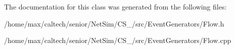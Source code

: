 \-The documentation for this class was generated from the following files\-:\begin{DoxyCompactItemize}
\item 
/home/max/caltech/senior/\-Net\-Sim/\-C\-S\-\_/src/\-Event\-Generators/\-Flow.\-h\item 
/home/max/caltech/senior/\-Net\-Sim/\-C\-S\-\_/src/\-Event\-Generators/\-Flow.\-cpp\end{DoxyCompactItemize}
